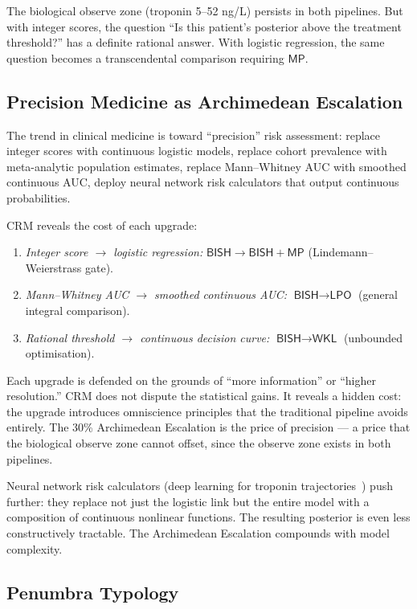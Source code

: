 \documentclass[11pt,a4paper]{article}
\theoremstyle{plain}
\theoremstyle{definition}
\newcommand{\BISH}{\textsf{BISH}}
\newcommand{\WKL}{\textsf{WKL}}
\newcommand{\LPO}{\textsf{LPO}}
\newcommand{\MP}{\textsf{MP}}
\begin{document}
The biological observe zone (troponin 5--52 ng/L) persists in both pipelines.  But with integer scores, the question ``Is this patient's posterior above the treatment threshold?'' has a definite rational answer.  With logistic regression, the same question becomes a transcendental comparison requiring $\MP$.

\subsection{Precision Medicine as Archimedean Escalation}

The trend in clinical medicine is toward ``precision'' risk assessment: replace integer scores with continuous logistic models, replace cohort prevalence with meta-analytic population estimates, replace Mann--Whitney AUC with smoothed continuous AUC, deploy neural network risk calculators that output continuous probabilities.

CRM reveals the cost of each upgrade:
\begin{enumerate}[nosep]
\item \emph{Integer score $\to$ logistic regression:} $\BISH \to \BISH + \MP$ (Lindemann--Weierstrass gate).
\item \emph{Mann--Whitney AUC $\to$ smoothed continuous AUC:} $\BISH \to \LPO$ (general integral comparison).
\item \emph{Rational threshold $\to$ continuous decision curve:} $\BISH \to \WKL$ (unbounded optimisation).
\end{enumerate}

Each upgrade is defended on the grounds of ``more information'' or ``higher resolution.''  CRM does not dispute the statistical gains.  It reveals a hidden cost: the upgrade introduces omniscience principles that the traditional pipeline avoids entirely.  The 30\% Archimedean Escalation is the price of precision --- a price that the biological observe zone cannot offset, since the observe zone exists in both pipelines.

Neural network risk calculators (deep learning for troponin trajectories~\cite{moons2012}) push further: they replace not just the logistic link but the entire model with a composition of continuous nonlinear functions.  The resulting posterior is even less constructively tractable.  The Archimedean Escalation compounds with model complexity.

\subsection{Penumbra Typology}
\end{document}
